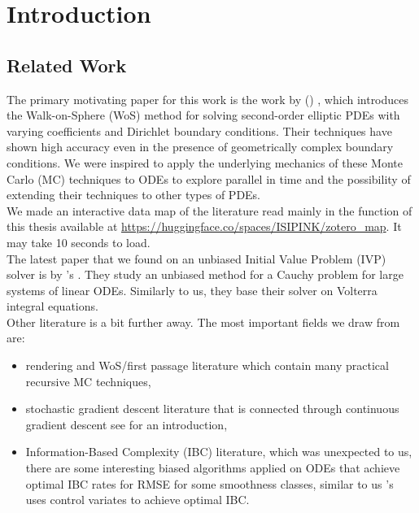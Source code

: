\documentclass[a4paper,12pt]{article}
\begin{document}


\newpage
\tableofcontents
\newpage

\begin{abstract}
    
\end{abstract}


\section{Introduction}

\subsection{Related Work}
The primary motivating paper for this work is the work
by \citeauthor{sawhney_grid-free_2022}
(\citeyear{sawhney_grid-free_2022}) \cite{sawhney_grid-free_2022},
which introduces the Walk-on-Sphere (WoS) method for solving second-order
elliptic PDEs with varying coefficients and Dirichlet boundary conditions.
Their techniques have shown high accuracy even in the presence of geometrically
complex boundary conditions. We were inspired to apply the underlying
mechanics of these Monte Carlo (MC) techniques to ODEs to explore
parallel in time and the possibility of extending their techniques
to other types of PDEs. \\

We made an interactive data map of the literature read
mainly in the function of this thesis available at
\url{https://huggingface.co/spaces/ISIPINK/zotero_map}.
It may take 10 seconds to load. \\

The latest paper that we found on an unbiased Initial Value Problem (IVP) solver is by
\citeauthor{ermakov_monte_2021}'s \citeyear{ermakov_monte_2021}
\cite{ermakov_monte_2021}.  They study an unbiased method for
a Cauchy problem for large systems of linear ODEs.
Similarly to us, they base their solver on Volterra integral equations.\\

Other literature is a bit further away.
The most important fields we draw from are:

\begin{itemize}
    \item rendering and WoS/first passage literature
          which contain many practical recursive
          MC techniques,

    \item  stochastic gradient descent literature
          that is connected through continuous gradient descent
          see \cite{huang_hybrid_2017} for an introduction,

    \item  Information-Based Complexity (IBC) literature, which was
          unexpected to us, there are some interesting
          biased algorithms applied on ODEs that achieve optimal
          IBC rates for RMSE for some smoothness classes, similar to us
          \citeauthor{daun_randomized_2011}'s \citeyear{daun_randomized_2011}
          \cite{daun_randomized_2011} uses control variates
          to achieve optimal IBC.
\end{itemize}
\end{document}
